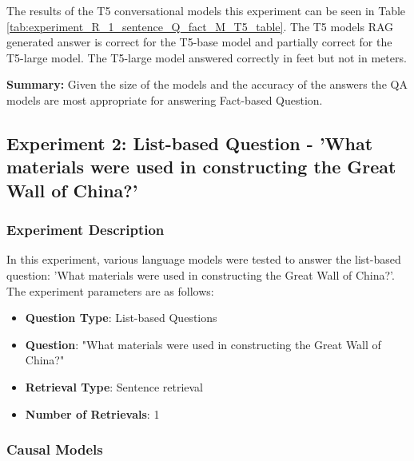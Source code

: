 \documentclass{wseas}
\begin{document}
The results of the T5 conversational models this experiment can be seen in 
Table \ref{tab:experiment_R_1_sentence_Q_fact_M_T5_table}.
The T5 models RAG generated answer is correct for the T5-base model and partially correct
for the T5-large model. The T5-large model answered correctly in feet but not in meters.


\textbf{Summary:}
Given the size of the models and the accuracy of the answers the QA models are most
appropriate for answering Fact-based Question.


\subsection{Experiment 2: List-based Question - 'What materials were
used in constructing the Great Wall of China?'}

\subsubsection{Experiment Description}

In this experiment, various language models were tested to answer the
list-based question: 'What materials were used in constructing the
Great Wall of China?'. The experiment parameters are as follows:

\begin{itemize}
\item
  \textbf{Question Type}: List-based Questions
\item
  \textbf{Question}: "What materials were used in constructing the Great Wall of China?"
\item
  \textbf{Retrieval Type}: Sentence retrieval
\item
  \textbf{Number of Retrievals}: 1
\end{itemize}

\subsubsection{Causal Models}
\end{document}
